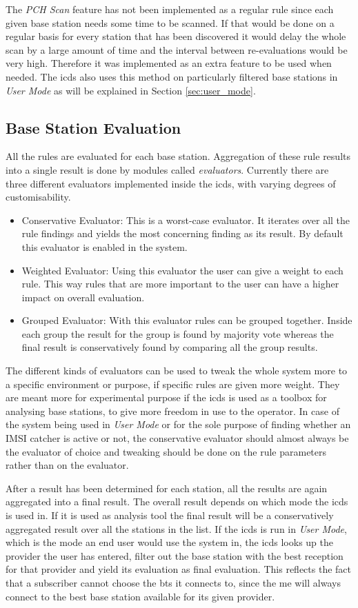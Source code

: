 The \emph{PCH Scan} feature has not been implemented as a regular rule since each given base station needs some time to be scanned.
If that would be done on a regular basis for every station that has been discovered it would delay the whole scan by a large amount of time and the interval between re-evaluations would be very high.
Therefore it was implemented as an extra feature to be used when needed.
The \gls{icds} also uses this method on particularly filtered base stations in \emph{User Mode} as will be explained in Section \ref{sec:user_mode}.

\subsection{Base Station Evaluation}
\label{sec:evaluators}
All the rules are evaluated for each base station.
Aggregation of these rule results into a single result is done by modules called \emph{evaluators}.
Currently there are three different evaluators implemented inside the \gls{icds}, with varying degrees of customisability.
\begin{itemize}
	\item Conservative Evaluator: This is a worst-case evaluator.
	It iterates over all the rule findings and yields the most concerning finding as its result.
	By default this evaluator is enabled in the system.
	\item Weighted Evaluator: Using this evaluator the user can give a weight to each rule.
	This way rules that are more important to the user can have a higher impact on overall evaluation.
	\item Grouped Evaluator: With this evaluator rules can be grouped together.
	Inside each group the result for the group is found by majority vote whereas the final result is conservatively found by comparing all the group results.
\end{itemize}
The different kinds of evaluators can be used to tweak the whole system more to a specific environment or purpose, if specific rules are given more weight.
They are meant more for experimental purpose if the \gls{icds} is used as a toolbox for analysing base stations, to give more freedom in use to the operator.
In case of the system being used in \emph{User Mode} or for the sole purpose of finding whether an IMSI catcher is active or not, the conservative evaluator should almost always be the evaluator of choice and tweaking should be done on the rule parameters rather than on the evaluator.

After a result has been determined for each station, all the results are again aggregated into a final result.
The overall result depends on which mode the \gls{icds} is used in.
If it is used as analysis tool the final result will be a conservatively aggregated result over all the stations in the list.
If the \gls{icds} is run in \emph{User Mode}, which is the mode an end user would use the system in, the \gls{icds} looks up the provider the user has entered, filter out the base station with the best reception for that provider and yield its evaluation as final evaluation.
This reflects the fact that a subscriber cannot choose the \gls{bts} it connects to, since the \gls{me} will always connect to the best base station available for its given provider.

